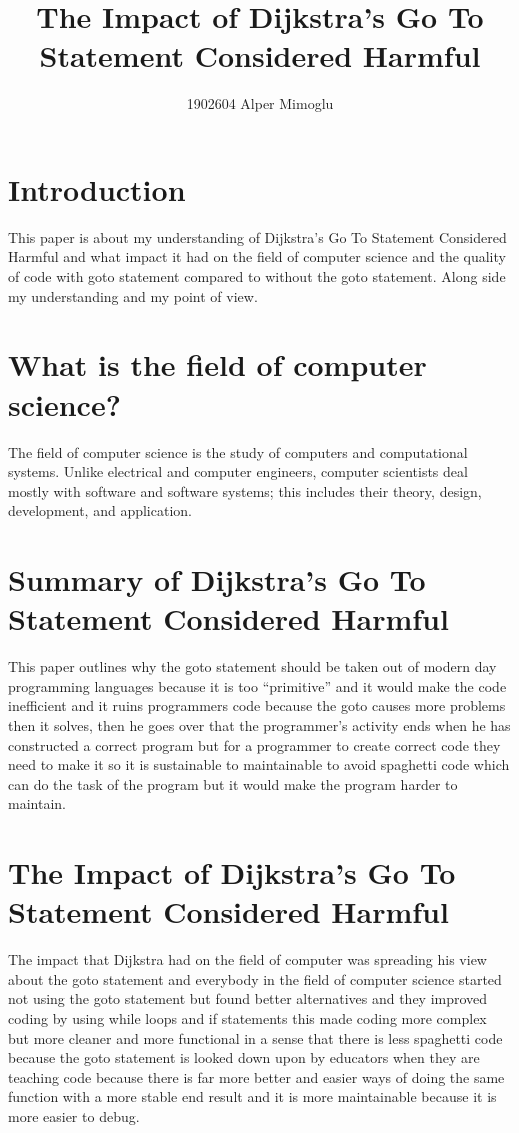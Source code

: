 \documentclass{article}
\title{The Impact of Dijkstra's Go To Statement Considered Harmful  }
\author{1902604 Alper Mimoglu}
\begin{document}
\maketitle

\section{Introduction}

This paper is about my understanding of Dijkstra's Go To Statement Considered Harmful and what impact it had on the field of computer science and the quality of code with goto statement compared to without the goto statement. Along side my understanding and my point of view.
\section{What is the field of computer science?}

The field of computer science is the study of computers and computational systems. Unlike electrical and computer engineers, computer scientists deal mostly with software and software systems; this includes their theory, design, development, and application.\cite{dept_of_CS}

\section{Summary of Dijkstra's Go To Statement Considered Harmful}

This paper outlines why the goto statement should be taken out of modern day programming languages  because it is too “primitive” and it would make the code inefficient and it ruins programmers code \cite{dijkstra1968_goto} because the goto causes more problems then it solves, then he goes over that the  programmer's activity ends when he has constructed a correct program \cite{dijkstra1968_goto}
but for a programmer to create correct code they need to make it so it is sustainable to maintainable to avoid spaghetti code which can do the task of the program but it would make the program harder to maintain.


\section{The Impact of Dijkstra's Go To Statement Considered Harmful}
The impact that Dijkstra had on the field of computer was spreading his view about the goto statement and everybody in the field of computer science started not using the goto statement but found better alternatives and they improved coding by using while loops and if statements this made coding more complex but more cleaner and more functional in a sense that there is less spaghetti code because the goto statement is looked down upon by educators when they are teaching code because there is far more better and easier ways of doing the same function with a more stable end result and it is more maintainable because it is more easier to debug.
\end{document}
